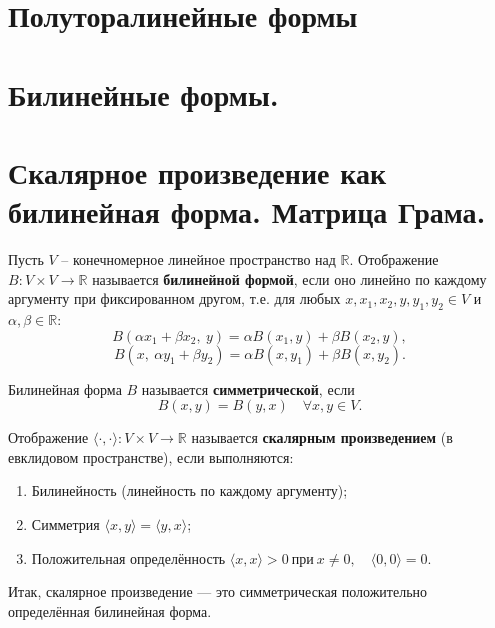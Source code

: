 \documentclass[14pt]{extreport}
\begin{document}
\chapter{Полуторалинейные формы}

    \chapter{ Билинейные формы.}

	\chapter{Скалярное произведение как билинейная форма. Матрица Грама.}
    \begin{defbox}
        Пусть $V$ – конечномерное линейное пространство над $\mathbb{R}$.
        Отображение $B: V \times V \rightarrow \mathbb{R}$ называется \textbf{билинейной формой}, если оно линейно по каждому аргументу при фиксированном другом, т.е. для любых $x, x_1, x_2, y, y_1, y_2 \in V$ и $\alpha, \beta \in \mathbb{R}$:
        \[
        B(\alpha x_1 + \beta x_2,\ y) = \alpha B(x_1, y) + \beta B(x_2, y),
        \]
        \vspace{-1.2cm}
        \[
        B(x,\ \alpha y_1 + \beta y_2) = \alpha B(x, y_1) + \beta B(x, y_2).
        \]
    \end{defbox}

    \begin{impbox}
        Билинейная форма $B$ называется \textbf{симметрической}, если
        \[
        B(x, y) = B(y, x) \quad \forall x,y \in V.
        \]
    \end{impbox}

    \begin{defbox}
        Отображение $\langle \cdot, \cdot \rangle : V \times V \rightarrow \mathbb{R}$ называется \textbf{скалярным произведением} (в евклидовом пространстве), если выполняются:
        \begin{enumerate}
            \item Билинейность (линейность по каждому аргументу);
            \item Симметрия $\langle x,y \rangle = \langle y,x \rangle$;
            \item Положительная определённость $\langle x,x \rangle > 0\ \text{при}\ x \neq 0, \quad \langle 0,0 \rangle = 0$.
        \end{enumerate}
        Итак, скалярное произведение — это симметрическая положительно определённая билинейная форма.
    \end{defbox}
\end{document}
